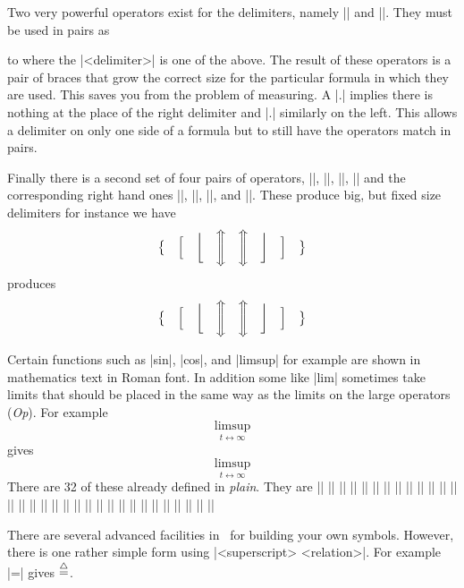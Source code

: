 Two very powerful operators exist for the delimiters, namely |\left| and
|\right|. They must be used in pairs as 
\par
\hbox to  
\noindent
where the |<delimiter>| is one of the above. The result
of these operators is a pair of braces that grow the correct size for the
particular formula in which they are used. This saves you from the problem of
measuring. A |\right.| implies there is nothing at the place of the right
delimiter and |\left.| similarly on the left. This allows a delimiter on only
one side of a formula but to still have the operators match in pairs.

Finally there is a second set of four pairs of operators, \@|\bigl|, |\Bigl|,
\@|\biggl|, \@|\Biggl| and the corresponding  right hand ones  \@|\bigr|, \@|\Bigr|,
\@|\biggr|, and \@|\Biggr|. These produce big, but fixed size delimiters for instance we have
\begintt
$$
 \bigl\{\quad 
\Bigl[\quad 
\biggl\lfloor\quad 
\Biggl\Updownarrow\quad\Biggr\Updownarrow
\quad\biggr\rfloor
\quad\Bigr]
\quad\bigr\}
$$
\endtt
produces
$$
 \bigl\{\quad 
\Bigl[\quad 
\biggl\lfloor\quad 
\Biggl\Updownarrow\quad\Biggr\Updownarrow
\quad\biggr\rfloor
\quad\Bigr]
\quad\bigr\}
$$

Certain functions such as |sin|, |cos|, and |limsup| for example are shown in
mathematics text in Roman font. In addition some like |lim| sometimes take
limits that should be placed in the same way as the limits on the large
operators ({\it Op}). For example
\begintt
$$
\limsup_{t \leftrightarrow \infty} 
$$
\endtt
gives
$$
\limsup_{t \leftrightarrow \infty} 
$$
There are 32 of these already defined in {\it plain}. They are
\beginthreecolumn
\@|\arg|    
\@|\arccos| 
\@|\arcsin| 
\@|\arctan| 
\@|\cot|  
\@|\coth| 
\@|\cosh| 
\@|\cos|  
\@|\csc|
\@|\det|
\@|\deg|
\@|\dim|
\@|\exp|
\@|\gcd|
\@|\hom|
\@|\inf|
\@|\ker|   
\@|\lg|    
\@|\liminf|
\@|\limsup|
\@|\lim|   
\@|\ln|    
\@|\log|   
\@|\max|   
\@|\min| 
\@|\Pr|  
\@|\sec| 
\@|\sin| 
\@|\sinh|
\@|\sup|
\@|\tanh|
\@|\tan|
\endthreecolumn

There are several advanced facilities in \tex\ for building your own symbols.
However, there is one rather simple form using 
\@|\buildrel <superscript> \over <relation>|. For example
|\buildrel \triangle  \over =| gives $\buildrel \triangle  \over =$.

\ejectpage
\done

